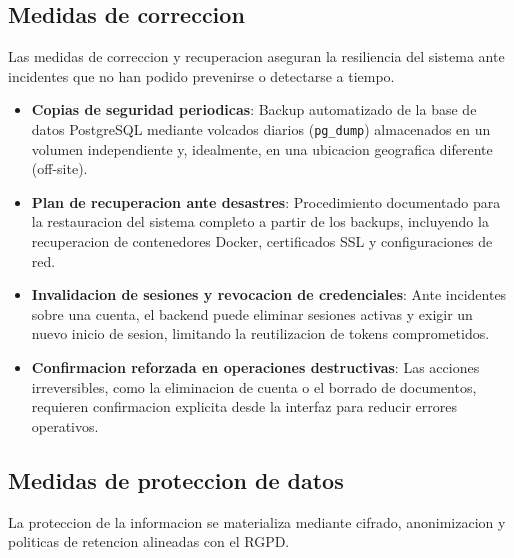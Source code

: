 \documentclass[11pt, a4paper]{article}
\begin{document}
\subsection{Medidas de correccion}

Las medidas de correccion y recuperacion aseguran la resiliencia del sistema ante incidentes que no han podido prevenirse o detectarse a tiempo.

\begin{itemize}
    \item \textbf{Copias de seguridad periodicas}: Backup automatizado de la base de datos PostgreSQL mediante volcados diarios (\texttt{pg\_dump}) almacenados en un volumen independiente y, idealmente, en una ubicacion geografica diferente (off-site).
    \item \textbf{Plan de recuperacion ante desastres}: Procedimiento documentado para la restauracion del sistema completo a partir de los backups, incluyendo la recuperacion de contenedores Docker, certificados SSL y configuraciones de red.
    \item \textbf{Invalidacion de sesiones y revocacion de credenciales}: Ante incidentes sobre una cuenta, el backend puede eliminar sesiones activas y exigir un nuevo inicio de sesion, limitando la reutilizacion de tokens comprometidos.
    \item \textbf{Confirmacion reforzada en operaciones destructivas}: Las acciones irreversibles, como la eliminacion de cuenta o el borrado de documentos, requieren confirmacion explicita desde la interfaz para reducir errores operativos.
\end{itemize}

\subsection{Medidas de proteccion de datos}

La proteccion de la informacion se materializa mediante cifrado, anonimizacion y politicas de retencion alineadas con el RGPD.
\end{document}

